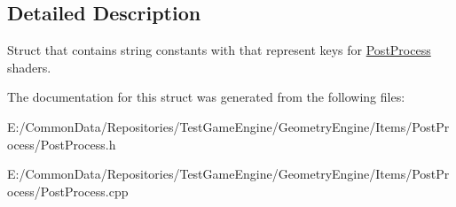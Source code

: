 \subsection{Detailed Description}
Struct that contains string constants with that represent keys for \mbox{\hyperlink{class_geometry_engine_1_1_geometry_post_process_1_1_post_process}{Post\+Process}} shaders. 

The documentation for this struct was generated from the following files\+:\begin{DoxyCompactItemize}
\item 
E\+:/\+Common\+Data/\+Repositories/\+Test\+Game\+Engine/\+Geometry\+Engine/\+Items/\+Post\+Process/Post\+Process.\+h\item 
E\+:/\+Common\+Data/\+Repositories/\+Test\+Game\+Engine/\+Geometry\+Engine/\+Items/\+Post\+Process/Post\+Process.\+cpp\end{DoxyCompactItemize}
